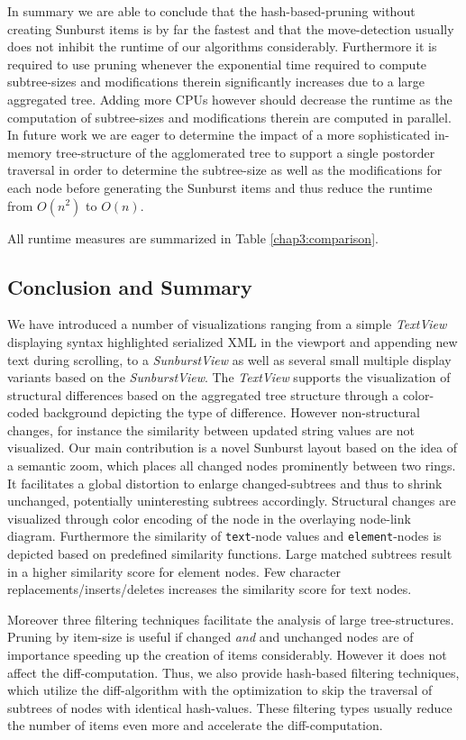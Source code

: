 In summary we are able to conclude that the hash-based-pruning without creating Sunburst items is by far the fastest and that the move-detection usually does not inhibit the runtime of our algorithms considerably. Furthermore it is required to use pruning whenever the exponential time required to compute subtree-sizes and modifications therein significantly increases due to a large aggregated tree. Adding more CPUs however should decrease the runtime as the computation of subtree-sizes and modifications therein are computed in parallel. In future work we are eager to determine the impact of a more sophisticated in-memory tree-structure of the agglomerated tree to support a single postorder traversal in order to determine the subtree-size as well as the modifications for each node before generating the Sunburst items and thus reduce the runtime from $O(n^2)$ to $O(n)$.

All runtime measures are summarized in Table \ref{chap3:comparison}.

\subsection{Conclusion and Summary}
We have introduced a number of visualizations ranging from a simple \emph{TextView} displaying syntax highlighted serialized XML in the viewport and appending new text during scrolling, to a \emph{SunburstView} as well as several small multiple display variants based on the \emph{SunburstView}. The \emph{TextView} supports the visualization of structural differences based on the aggregated tree structure through a color-coded background depicting the type of difference. However non-structural changes, for instance the similarity between updated string values are not visualized. Our main contribution is a novel Sunburst layout based on the idea of a semantic zoom, which places all changed nodes prominently between two rings. It facilitates a global distortion to enlarge changed-subtrees and thus to shrink unchanged, potentially uninteresting subtrees accordingly. Structural changes are visualized through color encoding of the node in the overlaying node-link diagram. Furthermore the similarity of \texttt{text}-node values and \texttt{element}-nodes is depicted based on predefined similarity functions. Large matched subtrees result in a higher similarity score for element nodes. Few character replacements/inserts/deletes increases the similarity score for text nodes.

Moreover three filtering techniques facilitate the analysis of large tree-struc\-tures. Pruning by item-size is useful if changed \emph{and} and unchanged nodes are of importance speeding up the creation of items considerably. However it does not affect the diff-computation. Thus, we also provide hash-based filtering techniques, which utilize the diff-algorithm with the optimization to skip the traversal of subtrees of nodes with identical hash-values. These filtering types usually reduce the number of items even more and accelerate the diff-computation.

